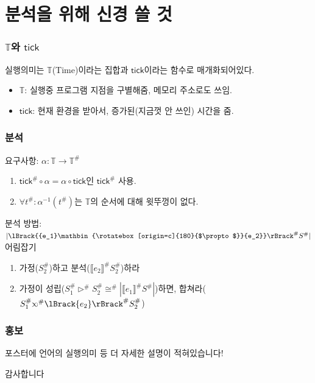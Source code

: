 \documentclass{beamer}
\newcommand*{\A}[1]{{#1}^{\#}}
\newcommand*{\Time}{\mathbb{T}}
\newcommand*{\semlink}{\mathbin{\rotatebox[origin=c]{180}{$\propto$}}}
\newcommand*{\link}[2]{{#1}\semlink{#2}}
\newcommand*{\sembracket}[1]{\lBrack{#1}\rBrack}
\newcommand*{\tick}{\mathsf{tick}}
\begin{document}
\section{분석을 위해 신경 쓸 것}
\begin{frame}[c]
  \frametitle{$\Time$와 $\tick$}
  실행의미는 $\Time$(Time)이라는 집합과 $\tick$이라는 함수로 매개화되어있다.
  \begin{itemize}
    \item $\Time$: 실행중 프로그램 지점을 구별해줌, 메모리 주소로도 쓰임.
    \item $\tick$: 현재 환경을 받아서, 증가된(지금껏 안 쓰인) 시간을 줌.
  \end{itemize}
\end{frame}
\begin{frame}[c]
  \frametitle{분석}
  요구사항: $\alpha:\Time\rightarrow\A\Time$
  \begin{enumerate}
    \item $\A\tick\circ\alpha=\alpha\circ\tick$인 $\A\tick$ 사용.
    \item $\forall\A{t}:\alpha^{-1}(\A{t})$는 $\Time$의 순서에 대해 윗뚜껑이 없다.
  \end{enumerate}
  분석 방법: $|\A{\sembracket{\link{e_1}{e_2}}}\A{S}|$ 어림잡기
  \begin{enumerate}
    \item 가정($\A{S}_2$)하고 분석($\A{\sembracket{e_2}}\A{S}_2$)하라
    \item 가정이 성립($\A{S}_1\A\rhd\A{S}_2\A\cong|\A{\sembracket{e_1}}\A{S}|$)하면, 합쳐라($\A{S}_1\A\semlink\A{\sembracket{e_2}}\A{S}_2$)
  \end{enumerate}
\end{frame}
\begin{frame}[c]
  \frametitle{홍보}
  \begin{center}
    포스터에 언어의 실행의미 등 더 자세한 설명이 적혀있습니다!
  \end{center}
\end{frame}
\begin{frame}[c]
  \centering\LARGE
  감사합니다
\end{frame}
\end{document}
